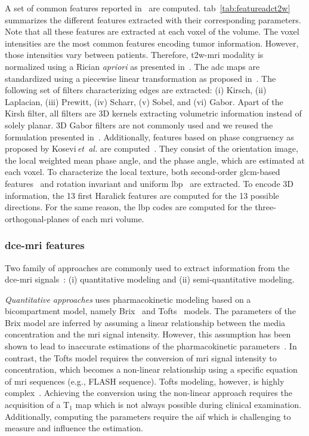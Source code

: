 \documentclass[final,3p,times,twocolumn]{elsarticle}
\begin{document}
A set of common features reported in~\cite{lemaitre2015computer} are
computed. \Acl{tab}~\ref{tab:featureadct2w} summarizes the different features
extracted with their corresponding parameters. Note that all these features are
extracted at each voxel of the volume. The voxel intensities are the most
common features encoding tumor information. However, those intensities vary
between patients. Therefore, \ac{t2w}-\ac{mri} modality is normalized using a
Rician \emph{apriori} as presented in~\cite{lemaitre2016normalization}. The
\Ac{adc} maps are standardized using a piecewise linear transformation as
proposed in~\cite{Nyul1999}. The following set of filters characterizing edges
are extracted: (i) Kirsch, (ii) Laplacian, (iii) Prewitt, (iv) Scharr, (v)
Sobel, and (vi) Gabor. Apart of the Kirsh filter, all filters are 3D kernels
extracting volumetric information instead of solely planar. 3D Gabor filters
are not commonly used and we reused the formulation presented
in~\cite{wang2005face}. Additionally, features based on phase congruency as
proposed by Kosevi\,\emph{et~al.} are computed~\cite{kovesi1999image}. They
consist of the orientation image, the local weighted mean phase angle, and
the phase angle, which are estimated at each voxel. To characterize the local
texture, both second-order \ac{glcm}-based features~\cite{Haralick1973} and
rotation invariant and uniform \ac{lbp}~\cite{ojala2002multiresolution} are
extracted. To encode 3D information, the 13 first Haralick features are
computed for the 13 possible directions. For the same reason, the \ac{lbp}
codes are computed for the three-orthogonal-planes of each \ac{mri} volume.

\subsubsection{\acs*{dce}-\acs*{mri} features}\label{features:dce}

Two family of approaches are commonly used to extract information from the
\ac{dce}-\ac{mri} signals~\cite{lemaitre2015computer}: (i) quantitative
modeling and (ii) semi-quantitative modeling. 

\emph{Quantitative approaches} uses pharmacokinetic modeling based on a
bicompartment model, namely Brix~\cite{brix1991pharmacokinetic} and
Tofts~\cite{tofts1995quantitative} models. The parameters of the Brix model
are inferred by assuming a linear relationship between the media concentration
and the \ac{mri} signal intensity. However, this assumption has been shown to
lead to inaccurate estimations of the pharmacokinetic
parameters~\cite{heilmann2006determination}. In contrast, the Tofts model
requires the conversion of \ac{mri} signal intensity to concentration, which
becomes a non-linear relationship using a specific equation of \ac{mri}
sequences (e.g., FLASH sequence). Tofts modeling, however, is highly
complex~\cite{gliozzi2011phenomenological}. Achieving the conversion using the
non-linear approach requires the acquisition of a T$_1$ map which is not always
possible during clinical examination. Additionally, computing the parameters
require the \ac{aif} which is challenging to measure and influence the estimation.
\end{document}
